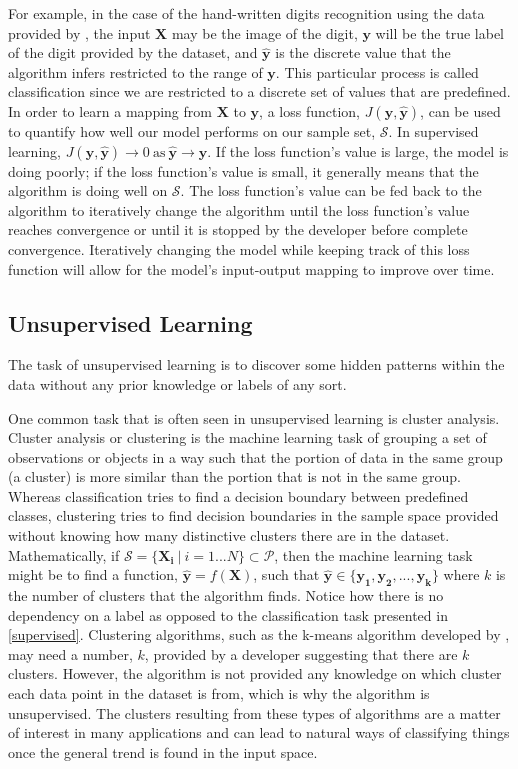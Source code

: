\noindent
For example, in the case of the hand-written digits recognition using the data provided by \citet{lecun1998mnist}, the input $\mathbf{X}$ may be the image of the digit, $\mathbf{y}$ will be the true label of the digit provided by the dataset, and $\mathbf{\hat{y}}$ is the discrete value that the algorithm infers restricted to the range of $\mathbf{y}$. This particular process is called classification since we are restricted to a discrete set of values that are predefined. In order to learn a mapping from $\mathbf{X}$ to $\mathbf{y}$, a loss function, $J(\mathbf{y}, \mathbf{\hat{y}})$, can be used to quantify how well our model performs on our sample set, $\mathcal{S}$. In supervised learning, $J(\mathbf{y}, \mathbf{\hat{y}}) \rightarrow 0 \ \text{as} \ \mathbf{\hat{y}} \rightarrow \mathbf{y}$. If the loss function's value is large, the model is doing poorly; if the loss function's value is small, it generally means that the algorithm is doing well on $\mathcal{S}$. The loss function's value can be fed back to the algorithm to iteratively change the algorithm until the loss function's value reaches convergence or until it is stopped by the developer before complete convergence. Iteratively changing the model while keeping track of this loss function will allow for the model's input-output mapping to improve over time. 

\subsection{Unsupervised Learning}

The task of unsupervised learning is to discover some hidden patterns within the data without any prior knowledge or labels of any sort. 

One common task that is often seen in unsupervised learning is cluster analysis. Cluster analysis or clustering is the machine learning task of grouping a set of observations or objects in a way such that the portion of data in the same group (a cluster) is more similar than the portion that is not in the same group. Whereas classification tries to find a decision boundary between predefined classes, clustering tries to find decision boundaries in the sample space provided without knowing how many distinctive clusters there are in the dataset. Mathematically, if $\mathcal{S} =\{  \mathbf{X_i} \ | \ i = 1...N\} \subset \mathcal{P}$, then the machine learning task might be to find a function, $\mathbf{\hat{y}} = f(\mathbf{X})$, such that $\mathbf{\hat{y}} \in \{\mathbf{y_1}, \mathbf{y_2}, ...,\mathbf{y_k}\}$ where $k$ is the number of clusters that the algorithm finds. Notice how there is no dependency on a label as opposed to the classification task presented in \cref{supervised}. Clustering algorithms, such as the k-means algorithm developed by \citet{macqueen1967some}, may need a number, $k$, provided by a developer suggesting that there are $k$ clusters. However, the algorithm is not provided any knowledge on which cluster each data point in the dataset is from, which is why the algorithm 	is unsupervised. The clusters resulting from these types of algorithms are a matter of interest in many applications and can lead to natural ways of classifying things once the general trend is found in the input space.  

